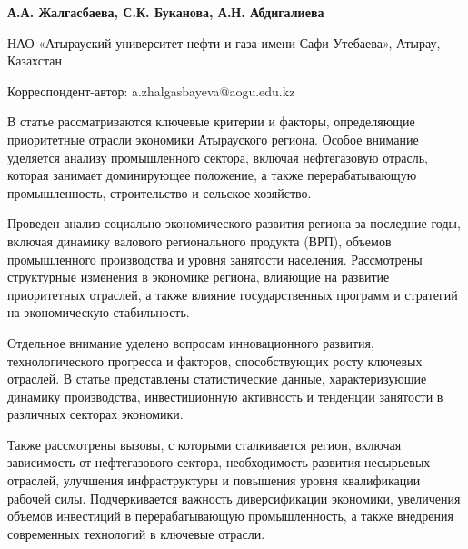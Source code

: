 
\begin{articleheader}

{\bfseries
А.А. Жалгасбаева\textsuperscript{\envelope },
С.К. Буканова,
А.Н. Абдигалиева
}
\end{articleheader}

\begin{affiliation}
НАО «Атырауский университет нефти и газа имени Сафи Утебаева», Атырау, Казахстан

\textsuperscript{\envelope }Корреспондент-автор: a.zhalgasbayeva@aogu.edu.kz
\end{affiliation}

В статье рассматриваются ключевые критерии и факторы, определяющие
приоритетные отрасли экономики Атырауского региона. Особое внимание
уделяется анализу промышленного сектора, включая нефтегазовую отрасль,
которая занимает доминирующее положение, а также перерабатывающую
промышленность, строительство и сельское хозяйство.

Проведен анализ социально-экономического развития региона за последние
годы, включая динамику валового регионального продукта (ВРП), объемов
промышленного производства и уровня занятости населения. Рассмотрены
структурные изменения в экономике региона, влияющие на развитие
приоритетных отраслей, а также влияние государственных программ и
стратегий на экономическую стабильность.

Отдельное внимание уделено вопросам инновационного развития,
технологического прогресса и факторов, способствующих росту ключевых
отраслей. В статье представлены статистические данные, характеризующие
динамику производства, инвестиционную активность и тенденции занятости в
различных секторах экономики.

Также рассмотрены вызовы, с которыми сталкивается регион, включая
зависимость от нефтегазового сектора, необходимость развития несырьевых
отраслей, улучшения инфраструктуры и повышения уровня квалификации
рабочей силы. Подчеркивается важность диверсификации экономики,
увеличения объемов инвестиций в перерабатывающую промышленность, а также
внедрения современных технологий в ключевые отрасли.

